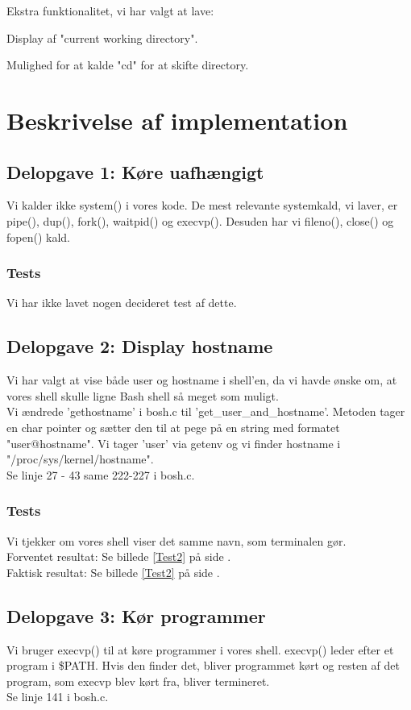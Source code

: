 Ekstra funktionalitet, vi har valgt at lave:
\begin{my_enumerate}
\item Display af "current working directory".
\item Mulighed for at kalde "cd" for at skifte directory.
\end{my_enumerate}

\section{Beskrivelse af implementation}
\subsection{Delopgave 1: Køre uafhængigt}
\label{D1}
Vi kalder ikke system() i vores kode. De mest relevante systemkald, vi laver, er pipe(), dup(), fork(), waitpid() og execvp(). Desuden har vi fileno(), close() og fopen() kald.
\subsubsection{Tests}
Vi har ikke lavet nogen decideret test af dette.

\subsection{Delopgave 2: Display hostname}
\label{D2}
Vi har valgt at vise både user og hostname i shell'en, da vi havde ønske om, at vores shell skulle ligne Bash shell så meget som muligt.
\\Vi ændrede 'gethostname' i bosh.c til 'get\_user\_and\_hostname'. Metoden tager en char pointer og sætter den til at pege på en string med formatet "user@hostname". Vi tager 'user' via getenv og vi finder hostname i "/proc/sys/kernel/hostname".
\\Se linje 27 - 43 same 222-227 i bosh.c.
\subsubsection{Tests}
Vi tjekker om vores shell viser det samme navn, som terminalen gør.
\\Forventet resultat: Se billede \ref{Test2} på side \pageref{Test2}.
\\Faktisk resultat: Se billede \ref{Test2} på side \pageref{Test2}.

\subsection{Delopgave 3: Kør programmer}
\label{D3}
Vi bruger execvp() til at køre programmer i vores shell. execvp() leder efter et program i \$PATH. Hvis den finder det, bliver programmet kørt og resten af det program, som execvp blev kørt fra, bliver termineret. 
\\Se linje 141 i bosh.c.
